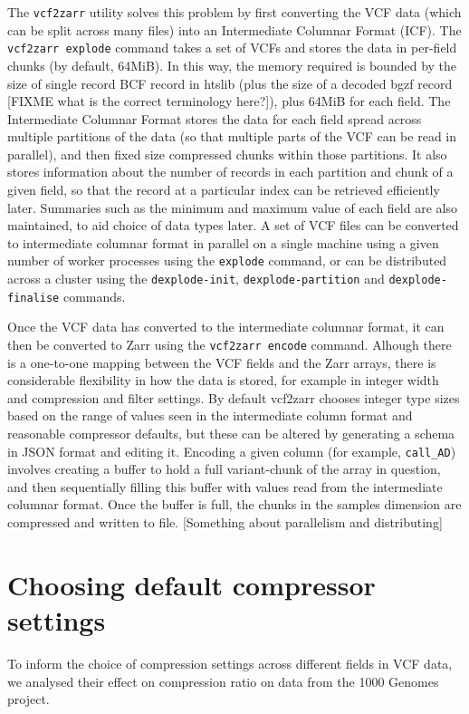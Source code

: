 \documentclass[a4paper,num-refs]{oup-contemporary}
\begin{document}
The \texttt{vcf2zarr} utility solves this problem by first converting 
the VCF data (which can be split across many files) into an Intermediate
Columnar Format (ICF). The \texttt{vcf2zarr explode} command takes a set
of VCFs and stores the data in per-field chunks (by default, 64MiB).
In this way, the memory required is bounded by the size of single record 
BCF record in htslib (plus the size of a decoded bgzf record
[FIXME what is the correct terminology here?]), plus 64MiB for each 
field.  The Intermediate Columnar Format stores the data for each 
field spread across multiple partitions of the data (so that 
multiple parts of the VCF can be read in parallel), and then 
fixed size compressed chunks within those partitions. It also stores information
about the number of records in each partition and chunk of a given
field, so that the record at a particular index can be retrieved efficiently 
later. Summaries such as the minimum and maximum value 
of each field are also maintained, to aid choice of data types later.
A set of VCF files can be converted to intermediate columnar 
format in parallel on a single machine using a given number 
of worker processes using the \texttt{explode} command,
or can be distributed across a cluster using the 
\texttt{dexplode-init},
\texttt{dexplode-partition} and \texttt{dexplode-finalise} commands.

Once the VCF data has converted to the intermediate columnar format,
it can then be converted to Zarr using the \texttt{vcf2zarr encode}
command. Alhough there is a one-to-one mapping between the VCF
fields and the Zarr arrays, there is considerable flexibility 
in how the data is stored, for example in integer width
and compression and filter settings.
By default vcf2zarr chooses integer type sizes based 
on the range of values seen in the intermediate column format
and reasonable compressor defaults, but these can be
altered by generating a schema in JSON format and editing it.
Encoding a given column (for example, \texttt{call\_AD})
involves creating a buffer to hold a full variant-chunk of the 
array in question, and then sequentially filling this buffer with 
values read from the intermediate columnar format. Once the buffer 
is full, the chunks in the samples dimension are compressed
and written to file. [Something about parallelism and distributing]

\section{Choosing default compressor settings}
To inform the choice of compression settings across different fields 
in VCF data, we analysed their effect on compression ratio on 
data from the 1000 Genomes project.
\end{document}
